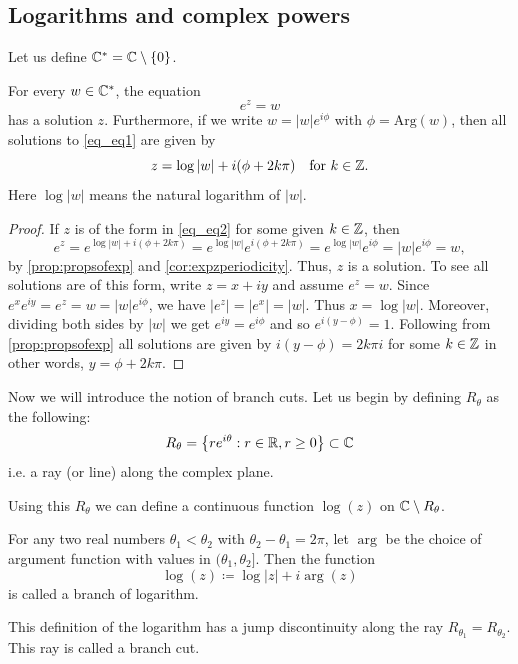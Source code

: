 \documentclass[10pt, a4paper]{article}
\begin{document}
\subsection{Logarithms and complex powers}
Let us define $\mathbb{C} ^ {*} = \mathbb{C} \setminus \{0\}$.
\begin{lemma}
    For every $w \in \mathbb{C} ^ {*}$,
    the equation
    \begin{equation}\label{eq_eq1}
        e ^ z = w
    \end{equation}
    has a solution $z$.
    Furthermore,
    if we write $w = |w|e ^ {i\phi}$ with $\phi = \mathrm{Arg}(w)$,
    then all solutions to \eqref{eq_eq1} are given by
    \begin{equation}\label{eq_eq2}
        z = \log{|w|} + i(\phi + 2k\pi)\quad\text{for } k \in \mathbb{Z}.
    \end{equation}
    Here $\log{|w|}$ means the natural logarithm of $|w|$.

    \begin{proof}
        If $z$ is of the form in \eqref{eq_eq2} for some given $k \in \mathbb{Z}$,
        then
        \[
        e ^ z = e ^ {\log{|w|} + i(\phi + 2k\pi)} = e ^ {\log{|w|}}e ^ {i(\phi + 2k\pi)} = e ^ {\log{|w|}}e ^ {i\phi} = |w|e ^ {i\phi} = w,
        \]
        by \autoref{prop:propsofexp} and \autoref{cor:expzperiodicity}.
        Thus,
        $z$ is a solution.
        To see all solutions are of this form,
        write $z = x + iy$ and assume $e ^ z = w$.
        Since $e ^ xe ^ {iy} = e ^ z = w = |w|e ^ {i\phi}$,
        we have $|e ^ z| = |e ^ x| = |w|$.
        Thus $x = \log{|w|}$.
        Moreover,
        dividing both sides by $|w|$ we get $e ^ {iy} = e ^ {i\phi}$ and so $e ^ {i(y - \phi)} = 1$.
        Following from \autoref{prop:propsofexp} all solutions are given by $i(y - \phi) = 2k\pi i$ for some $k \in \mathbb{Z}$ in other words,
        $y = \phi + 2k\pi$.
    \end{proof}
\end{lemma}

Now we will introduce the notion of branch cuts.
Let us begin by defining $R_{\theta}$ as the following:
\[
R_{\theta} = \left\{re ^ {i\theta} : r \in \mathbb{R}, r \geq 0 \right\} \subset \mathbb{C}
\]
i.e. a ray
(or line)
along the complex plane.

Using this $R_{\theta}$ we can define a continuous function $\log(z)$ on $\mathbb{C} \setminus R_{\theta}$.

\begin{definition}
    For any two real numbers $\theta_1 < \theta_2$ with $\theta_2 - \theta_1 = 2\pi$,
    let $\arg$ be the choice of argument function with values in $(\theta_1, \theta_2]$.
    Then the function
    \[
    \log(z) \coloneqq \log{|z|} + i\arg(z)
    \]
    is called a branch of logarithm.
\end{definition}
This definition of the logarithm has a jump discontinuity along the ray $R_{\theta_1} = R_{\theta_2}$.
This ray is called a branch cut.
\end{document}
